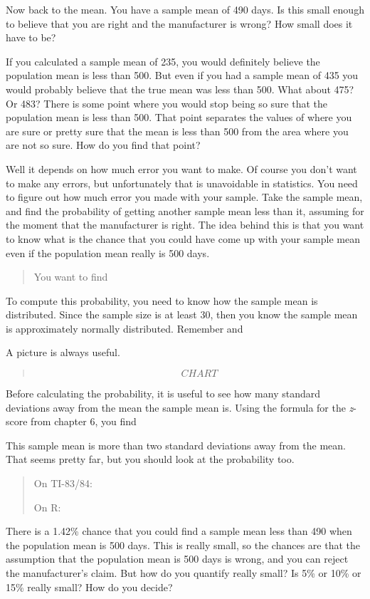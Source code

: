 \documentclass[]{book}
\begin{document}
Now back to the mean. You have a sample mean of 490 days. Is this small enough to believe that you are right and the manufacturer is wrong? How small does it have to be?

If you calculated a sample mean of 235, you would definitely believe the population mean is less than 500. But even if you had a sample mean of 435 you would probably believe that the true mean was less than 500. What about 475? Or 483? There is some point where you would stop being so sure that the population mean is less than 500. That point separates the values of where you are sure or pretty sure that the mean is less than 500 from the area where you are not so sure. How do you find that point?

Well it depends on how much error you want to make. Of course you don't want to make any errors, but unfortunately that is unavoidable in statistics. You need to figure out how much error you made with your sample. Take the sample mean, and find the probability of getting another sample mean less than it, assuming for the moment that the manufacturer is right. The idea behind this is that you want to know what is the chance that you could have come up with your sample mean even if the population mean really is 500 days.

\begin{quote}
You want to find
\end{quote}

To compute this probability, you need to know how the sample mean is distributed. Since the sample size is at least 30, then you know the sample mean is approximately normally distributed. Remember and

A picture is always useful.

\begin{quote}
{\[CHART\]}
\end{quote}

Before calculating the probability, it is useful to see how many standard deviations away from the mean the sample mean is. Using the formula for the \emph{z}-score from chapter 6, you find

This sample mean is more than two standard deviations away from the mean. That seems pretty far, but you should look at the probability too.

\begin{quote}
On TI-83/84:

On R:
\end{quote}

There is a 1.42\% chance that you could find a sample mean less than 490 when the population mean is 500 days. This is really small, so the chances are that the assumption that the population mean is 500 days is wrong, and you can reject the manufacturer's claim. But how do you quantify really small? Is 5\% or 10\% or 15\% really small? How do you decide?
\end{document}
